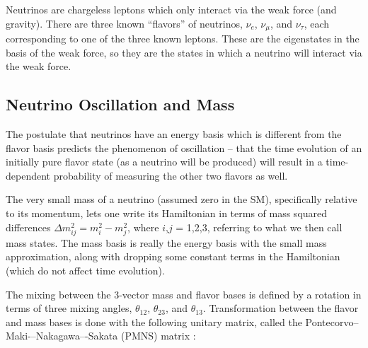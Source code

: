 Neutrinos are chargeless leptons which only interact via the weak force (and gravity).  There are three known ``flavors'' of neutrinos, $\nu_{e}$, $\nu_{\mu}$, and $\nu_{\tau}$, each corresponding to one of the three known leptons.  These are the eigenstates in the basis of the weak force, so they are the states in which a neutrino will interact via the weak force.

\subsection{Neutrino Oscillation and Mass}

The postulate that neutrinos have an energy basis which is different from the flavor basis predicts the phenomenon of oscillation -- that the time evolution of an initially pure flavor state (as a neutrino will be produced) will result in a time-dependent probability of measuring the other two flavors as well.  

The very small mass of a neutrino (assumed zero in the SM), specifically relative to its momentum, lets one write its Hamiltonian in terms of mass squared differences $\Delta m_{ij}^{2} = m_{i}^{2} - m_{j}^{2}$, where $i$,$j$ = 1,2,3, referring to what we then call mass states.  The mass basis is really the energy basis with the small mass approximation, along with dropping some constant terms in the Hamiltonian (which do not affect time evolution).

The mixing between the 3-vector mass and flavor bases is defined by a rotation in terms of three mixing angles, $\theta_{12}$, $\theta_{23}$, and $\theta_{13}$.  Transformation between the flavor and mass bases is done with the following unitary matrix, called the Pontecorvo--Maki-–Nakagawa–-Sakata (PMNS) matrix \cite{ReviewNuMass}:

